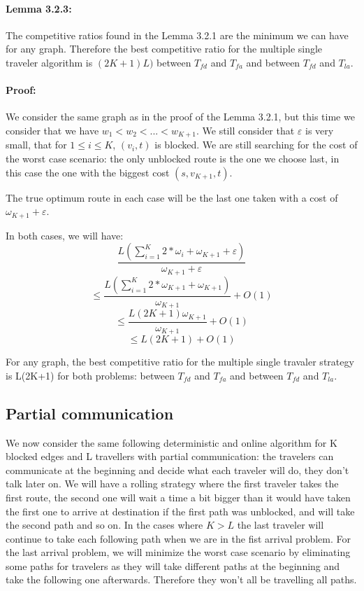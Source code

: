 \documentclass[a4paper, 10pt]{article}
\begin{document}
\paragraph{Lemma 3.2.3:} The competitive ratios found in the Lemma 3.2.1 are the minimum we can have for any graph. Therefore the best competitive ratio for the multiple single traveler algorithm is $(2K+1)L)$ between $T_{fd}$ and $T_{fa}$ and between $T_{fd}$ and $T_{la}$.

\paragraph{Proof:} We consider the same graph as in the proof of the Lemma 3.2.1, but this time we consider that we have $w_1 < w_2 < ... < w_{K+1}$. We still consider that $\varepsilon$ is very small, that for $1\leq i \leq K$, $(v_i,t)$ is blocked. We are still searching for the cost of the worst case scenario: the only unblocked route is the one we choose last, in this case the one with the biggest cost $(s,v_{K+1},t)$.

The true optimum route in each case will be the last one taken with a cost of $\omega_{K+1} + \varepsilon$.

In both cases, we will have:
\[
\frac {L(\sum_{i=1}^{K} 2*\omega_{i} + \omega_{K+1} + \varepsilon)} {\omega_{K+1} + \varepsilon} 
\]
\[
\leq \frac {L(\sum_{i=1}^{K} 2*\omega_{K+1} + \omega_{K+1})} {\omega_{K+1}} + O(1) 
\]
\[
\leq \frac {L(2K+1)\omega_{K+1} } {\omega_{K+1}} + O(1)
\]
\[
\leq L(2K+1) + O(1)
\]

For any graph, the best competitive ratio for the multiple single travaler strategy is L(2K+1) for both problems: between $T_{fd}$ and $T_{fa}$ and between $T_{fd}$ and $T_{la}$.

\subsection{Partial communication}
We now consider the same following deterministic and online algorithm for K blocked edges and L travellers with partial communication: the travelers can communicate at the beginning and decide what each traveler will do, they don't talk later on. We will have a rolling strategy where the first traveler takes the first route, the second one will wait a time a bit bigger than it would have taken the first one to arrive at destination if the first path was unblocked, and will take the second path and so on. In the cases where $K>L$ the last traveler will continue to take each following path when we are in the fist arrival problem. For the last arrival problem, we will minimize the worst case scenario by eliminating some paths for travelers as they will take different paths at the beginning and take the following one afterwards. Therefore they won't all be travelling all paths.
\end{document}
